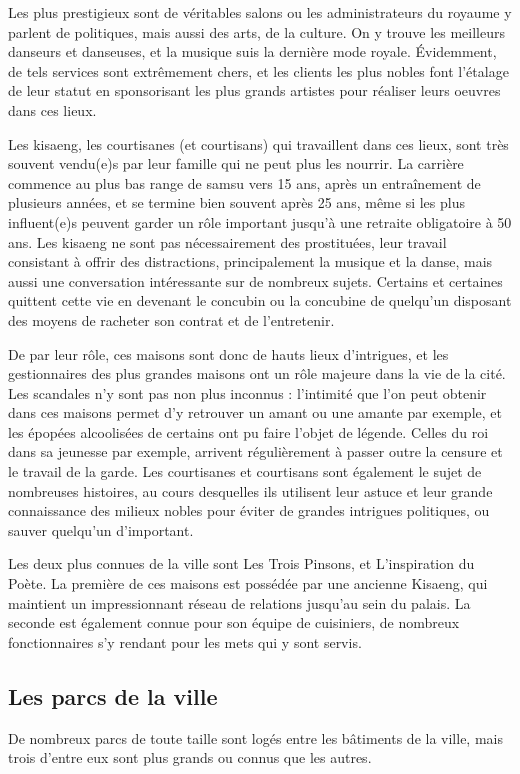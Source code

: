 \documentclass[10pt,a4paper]{book}
\begin{document}
Les plus prestigieux sont de véritables salons ou les administrateurs du royaume y parlent de politiques, mais aussi des arts, de la culture. On y trouve les meilleurs danseurs et danseuses, et la musique suis la dernière mode royale. Évidemment, de tels services sont extrêmement chers, et les clients les plus nobles font l'étalage de leur statut en sponsorisant les plus grands artistes pour réaliser leurs oeuvres dans ces lieux. 

Les kisaeng, les courtisanes (et courtisans) qui travaillent dans ces lieux, sont très souvent vendu(e)s par leur famille qui ne peut plus les nourrir. La carrière commence au plus bas range de samsu vers 15 ans, après un entraînement de plusieurs années, et se termine bien souvent après 25 ans, même si les plus influent(e)s peuvent garder un rôle important jusqu'à une retraite obligatoire à 50 ans. Les kisaeng ne sont pas nécessairement des prostituées, leur travail consistant à offrir des distractions, principalement la musique et la danse, mais aussi une conversation intéressante sur de nombreux sujets. Certains et certaines quittent cette vie en devenant le concubin ou la concubine de quelqu'un disposant des moyens de racheter son contrat et de l'entretenir.

De par leur rôle, ces maisons sont donc de hauts lieux d'intrigues, et les gestionnaires des plus grandes maisons ont un rôle majeure dans la vie de la cité. Les scandales n'y sont pas non plus inconnus : l'intimité que l'on peut obtenir dans ces maisons permet d'y retrouver un amant ou une amante par exemple, et les épopées alcoolisées de certains ont pu faire l'objet de légende. Celles du roi dans sa jeunesse par exemple, arrivent régulièrement à passer outre la censure et le travail de la garde. Les courtisanes et courtisans sont également le sujet de nombreuses histoires, au cours desquelles ils utilisent leur astuce et leur grande connaissance des milieux nobles pour éviter de grandes intrigues politiques, ou sauver quelqu'un d'important.

Les deux plus connues de la ville sont Les Trois Pinsons, et L'inspiration du Poète. La première de ces maisons est possédée par une ancienne Kisaeng, qui maintient un impressionnant réseau de relations jusqu'au sein du palais. La seconde est également connue pour son équipe de cuisiniers, de nombreux fonctionnaires s'y rendant pour les mets qui y sont servis.
\subsection{Les parcs de la ville}
De nombreux parcs de toute taille sont logés entre les bâtiments de la ville, mais trois d'entre eux sont plus grands ou connus que les autres.
\end{document}
